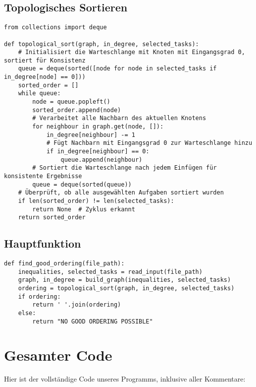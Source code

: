 \documentclass{article}
\begin{document}
\subsection{Topologisches Sortieren}

\begin{lstlisting}[style=custompython]
from collections import deque

def topological_sort(graph, in_degree, selected_tasks):
    # Initialisiert die Warteschlange mit Knoten mit Eingangsgrad 0, sortiert für Konsistenz
    queue = deque(sorted([node for node in selected_tasks if in_degree[node] == 0]))
    sorted_order = []
    while queue:
        node = queue.popleft()
        sorted_order.append(node)
        # Verarbeitet alle Nachbarn des aktuellen Knotens
        for neighbour in graph.get(node, []):
            in_degree[neighbour] -= 1
            # Fügt Nachbarn mit Eingangsgrad 0 zur Warteschlange hinzu
            if in_degree[neighbour] == 0:
                queue.append(neighbour)
        # Sortiert die Warteschlange nach jedem Einfügen für konsistente Ergebnisse
        queue = deque(sorted(queue))
    # Überprüft, ob alle ausgewählten Aufgaben sortiert wurden
    if len(sorted_order) != len(selected_tasks):
        return None  # Zyklus erkannt
    return sorted_order
\end{lstlisting}

\subsection{Hauptfunktion}

\begin{lstlisting}[style=custompython]
def find_good_ordering(file_path):
    inequalities, selected_tasks = read_input(file_path)
    graph, in_degree = build_graph(inequalities, selected_tasks)
    ordering = topological_sort(graph, in_degree, selected_tasks)
    if ordering:
        return ' '.join(ordering)
    else:
        return "NO GOOD ORDERING POSSIBLE"
\end{lstlisting}

\section{Gesamter Code}

Hier ist der vollständige Code unseres Programms, inklusive aller Kommentare:
\end{document}
